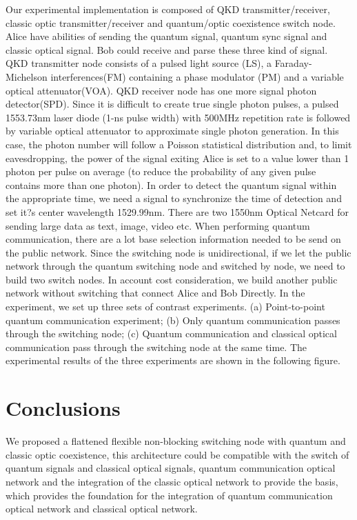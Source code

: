 \documentclass[letterpaper,10pt]{article}
\begin{document}
Our experimental implementation is composed of QKD transmitter/receiver, classic optic transmitter/receiver and quantum/optic coexistence switch node. Alice have abilities of sending the quantum signal, quantum sync signal and classic optical signal. Bob could receive and parse these three kind of signal. QKD transmitter node consists of a pulsed light source (LS), a Faraday-Michelson interferences(FM) containing a phase modulator (PM) and a variable optical attenuator(VOA). QKD receiver node has one more signal photon detector(SPD). Since it is difficult to create true single photon pulses, a pulsed 1553.73nm laser diode (1-ns pulse width) with 500MHz repetition rate is followed by variable optical attenuator to approximate single photon generation. In this case, the photon number will follow a Poisson statistical distribution and, to limit eavesdropping, the power of the signal exiting Alice is set to a value lower than 1 photon per pulse on average (to reduce the probability of  any given pulse contains more than one photon). In order to detect the quantum signal within the appropriate time, we need a signal to synchronize the time of detection and set it?s center wavelength 1529.99nm. There are two 1550nm Optical Netcard for sending large data as text, image, video etc. When performing quantum communication, there are a lot base selection information needed to be send on the public network. Since the switching node is unidirectional, if we let the public network through the quantum switching node and switched by node, we need to build two switch nodes. In account cost consideration, we build another public network without switching  that connect Alice and Bob Directly. In the experiment, we set up three sets of contrast experiments. (a) Point-to-point quantum communication experiment; (b) Only quantum communication passes through the switching node; (c) Quantum communication and classical optical communication pass through the switching node at the same time. The experimental results of the three experiments are shown in the following figure.


\section{Conclusions}
We proposed a flattened flexible non-blocking switching node with quantum and classic optic coexistence, this architecture could be compatible with the switch of quantum signals and classical optical signals,  quantum communication optical network and the integration of the classic optical network to provide the basis, which provides the foundation for the integration of quantum communication optical network and classical optical network.
\end{document}
